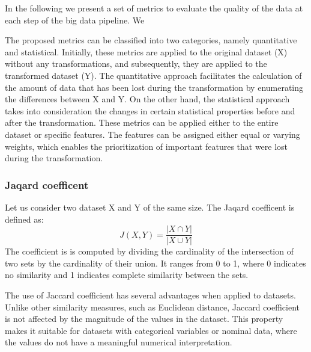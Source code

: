 In the following we present a set of metrics to evaluate the quality of the data at each step of the big data pipeline.
We

The proposed metrics can be classified into two categories, namely quantitative and statistical.
Initially, these metrics are applied to the original dataset (X) without any transformations, and subsequently, they are applied to the transformed dataset (Y).
The quantitative approach facilitates the calculation of the amount of data that has been lost during the transformation by enumerating the differences between X and Y.
On the other hand, the statistical approach takes into consideration the changes in certain statistical properties before and after the transformation.
These metrics can be applied either to the entire dataset or specific features.
The features can be assigned either equal or varying weights, which enables the prioritization of important features that were lost during the transformation.


\subsubsection{Jaqard coefficent}
Let us consider two dataset X and Y of the same size.
The Jaqard coefficent is defined as:\[J(X,Y) = \frac{|X \cap Y|}{|X \cup Y|}\]
The coefficient is is computed by dividing the cardinality of the intersection of two sets by the cardinality of their union.
It ranges from 0 to 1, where 0 indicates no similarity and 1 indicates complete similarity between the sets.

The use of Jaccard coefficient has several advantages when applied to datasets.
Unlike other similarity measures, such as Euclidean distance, Jaccard coefficient is not affected by the magnitude of the values in the dataset.
This property makes it suitable for datasets with categorical variables or nominal data, where the values do not have a meaningful numerical interpretation.

